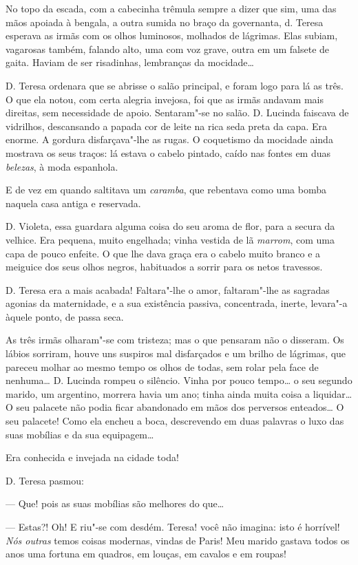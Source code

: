 No topo da escada, com a cabecinha trêmula sempre a dizer que sim, uma
das mãos apoiada à bengala, a outra sumida no braço da governanta, d.
Teresa esperava as irmãs com os olhos luminosos, molhados de lágrimas.
Elas subiam, vagarosas também, falando alto, uma com voz grave, outra em
um falsete de gaita. Haviam de ser risadinhas, lembranças da mocidade\ldots{}

D. Teresa ordenara que se abrisse o salão principal, e foram logo para
lá as três. O que ela notou, com certa alegria invejosa, foi que as
irmãs andavam mais direitas, sem necessidade de apoio. Sentaram"-se no
salão. D. Lucinda faiscava de vidrilhos, descansando a papada cor de
leite na rica seda preta da capa. Era enorme. A gordura disfarçava"-lhe
as rugas. O coquetismo da mocidade ainda mostrava os seus traços: lá
estava o cabelo pintado, caído nas fontes em duas \emph{belezas}, à moda
espanhola.

E de vez em quando saltitava um \emph{caramba}, que rebentava como uma
bomba naquela casa antiga e reservada.

D. Violeta, essa guardara alguma coisa do seu aroma de flor, para a
secura da velhice. Era pequena, muito engelhada; vinha vestida de lã
\emph{marrom}, com uma capa de pouco enfeite. O que lhe dava graça era o
cabelo muito branco e a meiguice dos seus olhos negros, habituados a
sorrir para os netos travessos.

D. Teresa era a mais acabada! Faltara"-lhe o amor, faltaram"-lhe as
sagradas agonias da maternidade, e a sua existência passiva,
concentrada, inerte, levara"-a àquele ponto, de passa seca.

As três irmãs olharam"-se com tristeza; mas o que pensaram não o
disseram. Os lábios sorriram, houve uns suspiros mal disfarçados e um
brilho de lágrimas, que pareceu molhar ao mesmo tempo os olhos de todas,
sem rolar pela face de nenhuma\ldots{} D. Lucinda rompeu o silêncio. Vinha
por pouco tempo\ldots{} o seu segundo marido, um argentino, morrera havia um
ano; tinha ainda muita coisa a liquidar\ldots{} O seu palacete não podia
ficar abandonado em mãos dos perversos enteados\ldots{} O seu palacete! Como
ela encheu a boca, descrevendo em duas palavras o luxo das suas mobílias
e da sua equipagem\ldots{}

Era conhecida e invejada na cidade toda!

D. Teresa pasmou:

--- Que! pois as suas mobílias são melhores do que\ldots{}

--- Estas?! Oh! E riu"-se com desdém. Teresa! você não imagina: isto é
horrível! \emph{Nós outras} temos coisas modernas, vindas de Paris! Meu
marido gastava todos os anos uma fortuna em quadros, em louças, em
cavalos e em roupas!

